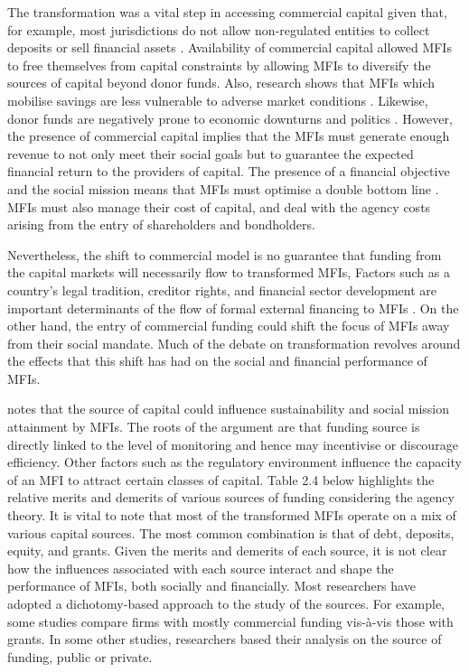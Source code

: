 \documentclass[a4paper, nobind]{templates/ociamthesis}
\begin{document}
The transformation was a vital step in accessing commercial capital given that, for example, most jurisdictions do not allow non-regulated entities to collect deposits or sell financial assets \autocite{dieckmann2007microfinance}. Availability of commercial capital allowed MFIs to free themselves from capital constraints by allowing MFIs to diversify the sources of capital beyond donor funds. Also, research shows that MFIs which mobilise savings are less vulnerable to adverse market conditions \autocite{frank2008stemming}. Likewise, donor funds are negatively prone to economic downturns and politics \autocite{garmaise2013cheap}. However, the presence of commercial capital implies that the MFIs must generate enough revenue to not only meet their social goals but to guarantee the expected financial return to the providers of capital. The presence of a financial objective and the social mission means that MFIs must optimise a double bottom line \autocite{mersland2010microfinance}. MFIs must also manage their cost of capital, and deal with the agency costs arising from the entry of shareholders and bondholders.

Nevertheless, the shift to commercial model is no guarantee that funding from the capital markets will necessarily flow to transformed MFIs, Factors such as a country's legal tradition, creditor rights, and financial sector development are important determinants of the flow of formal external financing to MFIs \autocite{tchuigoua2014institutional}. On the other hand, the entry of commercial funding could shift the focus of MFIs away from their social mandate\autocite{casselman2013microfinance}. Much of the debate on transformation revolves around the effects that this shift has had on the social and financial performance of MFIs.

\textcite{bogan2012capital} notes that the source of capital could influence sustainability and social mission attainment by MFIs. The roots of the argument are that funding source is directly linked to the level of monitoring and hence may incentivise or discourage efficiency. Other factors such as the regulatory environment influence the capacity of an MFI to attract certain classes of capital. Table 2.4 below highlights the relative merits and demerits of various sources of funding considering the agency theory.
It is vital to note that most of the transformed MFIs operate on a mix of various capital sources. The most common combination is that of debt, deposits, equity, and grants. Given the merits and demerits of each source, it is not clear how the influences associated with each source interact and shape the performance of MFIs, both socially and financially. Most researchers have adopted a dichotomy-based approach to the study of the sources. For example, some studies compare firms with mostly commercial funding vis-à-vis those with grants. In some other studies, researchers based their analysis on the source of funding, public or private.
\end{document}
